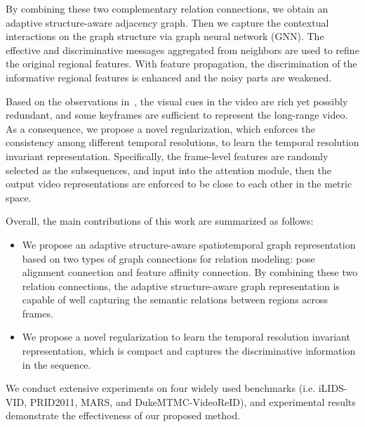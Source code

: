 \documentclass[journal]{IEEEtran}
\begin{document}
By combining these two complementary relation connections, we obtain an adaptive structure-aware adjacency graph. Then we capture the contextual interactions on the graph structure via graph neural network (GNN). The effective and discriminative messages aggregated from neighbors are used to refine the original regional features. With feature propagation, the discrimination of the informative regional features is enhanced and the noisy parts are weakened.

Based on the observations in~\cite{Zhang_2018_CVPR}, the visual cues in the video are rich yet possibly redundant, and some keyframes are sufficient to represent the long-range video. As a consequence, we propose a novel regularization, which enforces the consistency among different temporal resolutions, to learn the temporal resolution invariant representation. Specifically, the frame-level features are randomly selected as the subsequences, and input into the attention module, then the output video representations are enforced to be close to each other in the metric space.

Overall, the main contributions of this work are summarized as follows:
\begin{itemize}
    \item We propose an adaptive structure-aware spatiotemporal graph representation based on two types of graph connections for relation modeling: pose alignment connection and feature affinity connection. By combining these two relation connections, the adaptive structure-aware graph representation is capable of well capturing the semantic relations between regions across frames.
    \item We propose a novel regularization to learn the temporal resolution invariant representation, which is compact and captures the discriminative information in the sequence.
\end{itemize}
We conduct extensive experiments on four widely used benchmarks (i.e. iLIDS-VID, PRID2011, MARS, and DukeMTMC-VideoReID), and experimental results demonstrate the effectiveness of our proposed method.
\end{document}
